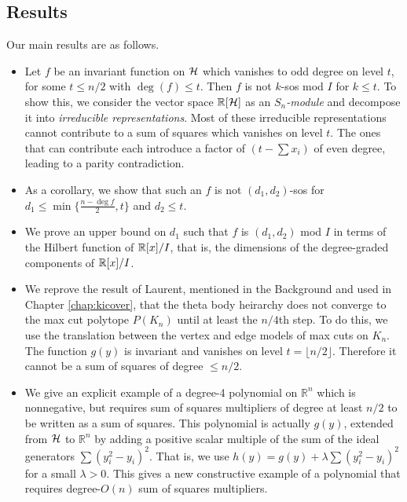 \subsection{Results}
Our main results are as follows.
\begin{itemize}
\item Let $f$ be an invariant function on $\mathcal{H}$ which vanishes to odd degree on level $t$, for some $t \le n/2$ with $\deg (f) \le t$. 
Then $f$ is not $k$-sos mod $I$ for $k \le t$.
To show this, we consider the vector space $\mathbb{R}[\mathcal{H}]$ as an {\em $S_n$-module} and decompose it into {\em irreducible representations}.
Most of these irreducible representations cannot contribute to a sum of squares which vanishes on level $t$.
The ones that can contribute each introduce a factor of $(t - \sum x_i)$ of even degree, leading to a parity contradiction.
\item As a corollary, we show that such an $f$ is not $(d_1,d_2)$-sos for $d_1 \le \min \{ \frac{n - \deg f}{2}, t \}$ and $d_2 \le t$.
\item We prove an upper bound on $d_1$ such that $f$ is $(d_1,d_2)$ mod $I$ in terms of the Hilbert function of $\mathbb{R}[x]/I$, that is, the dimensions of the degree-graded components of $\mathbb{R}[x]/I$.
\item We reprove the result of Laurent, mentioned in the Background and used in Chapter \ref{chap:kicover}, that the theta body heirarchy does not converge to the max cut polytope $P(K_n)$ until at least the $n/4$th step.
To do this, we use the translation between the vertex and edge models of max cuts on $K_n$.
The function $g(y)$ is invariant and vanishes on level $t = \lfloor n/2 \rfloor$.
Therefore it cannot be a sum of squares of degree $\le n/2$.
\item We give an explicit example of a degree-4 polynomial on $\mathbb{R}^n$ which is nonnegative, but requires sum of squares multipliers of degree at least $n/2$ to be written as a sum of squares.
This polynomial is actually $g(y)$, extended from $\mathcal{H}$ to $\mathbb{R}^n$ by adding a positive scalar multiple of the sum of the ideal generators $\sum (y_i^2 - y_i)^2$.
That is, we use $h(y) = g(y) + \lambda \sum (y_i^2 - y_i)^2$ for a small $\lambda > 0$.
This gives a new constructive example of a polynomial that requires degree-$O(n)$ sum of squares multipliers.
\end{itemize}

